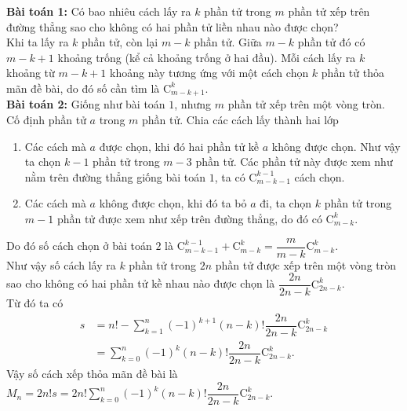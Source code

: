 \begin{bt}
{		{\bf Bài toán 1:} Có bao nhiêu cách lấy ra $k$ phần tử trong $m$ phần tử xếp trên đường thẳng sao cho không có hai phần tử liền nhau nào được chọn?\\
		Khi ta lấy ra $k$ phần tử, còn lại $m-k$ phần tử. Giữa $m-k$ phần tử đó có $m-k+1$ khoảng trống (kể cả khoảng trống ở hai đầu). Mỗi cách lấy ra $k$ khoảng từ $m-k+1$ khoảng này tương ứng với một cách chọn $k$ phần tử thỏa mãn đề bài, do đó số cần tìm là $\mathrm{C}_{m-k+1}^k$.\\
		{\bf  Bài toán 2:} Giống như bài toán $1$, nhưng $m$ phần tử xếp trên một vòng tròn.\\
		Cố định phần tử $a$ trong $m$ phần tử. Chia các cách lấy thành hai lớp
		\begin{enumerate}[1.]
			\item Các cách mà $a$ được chọn, khi đó hai phần tử kề $a$ không được chọn. Như vậy ta chọn $k-1$ phần tử trong $m-3$ phần tử. Các phần tử này được xem như nằm trên đường thẳng giống bài toán $1$, ta có $\mathrm{C}_{m-k-1}^{k-1}$ cách chọn.
			\item Các cách mà $a$ không được chọn, khi đó ta bỏ $a$ đi, ta chọn $k$ phần tử trong $m-1$ phần tử được xem như xếp trên đường thẳng, do đó có $\mathrm{C}_{m-k}^k$.
		\end{enumerate}
		Do đó số cách chọn ở bài toán $2$ là $\mathrm{C}_{m-k-1}^{k-1} + \mathrm{C}_{m-k}^k = \dfrac{m}{m-k} \mathrm{C}_{m-k}^k$.\\
		Như vậy số cách lấy ra $k$ phần tử trong $2n$ phần tử được xếp trên một vòng tròn sao cho không có hai phần tử kề nhau nào được chọn là $\dfrac{2n}{2n-k} \mathrm{C}_{2n-k}^k$.\\
		Từ đó ta có 
		\begin{align*}
		s & =n! - \sum \limits_{k=1}^n (-1)^{k+1} (n-k)! \dfrac{2n}{2n-k} \mathrm{C}_{2n-k}^k\\
		& = \sum \limits_{k=0}^n (-1)^k (n-k)! \dfrac{2n}{2n-k} \mathrm{C}_{2n-k}^k.
		\end{align*}
		Vậy số cách xếp thỏa mãn đề bài là $\displaystyle M_n = 2n! s = 2n! \sum \limits_{k=0}^n (-1)^k (n-k)! \dfrac{2n}{2n-k} \mathrm{C}_{2n-k}^k$.
	}
\end{bt}

